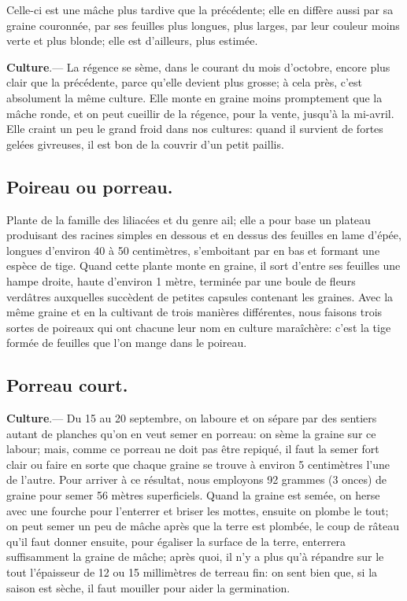 \documentclass[10pt,a4paper]{book}
\begin{document}
Celle-ci est une mâche plus tardive que la précédente; elle en diffère aussi par sa graine couronnée, par ses feuilles plus longues, plus larges, par leur couleur moins verte et plus blonde; elle est d'ailleurs, plus estimée.

\textbf{Culture}.--- La régence se sème, dans le courant du mois d'octobre, encore plus clair que la précédente, parce qu'elle devient plus grosse; à cela près, c'est absolument la même culture. Elle monte en graine moins promptement que la mâche ronde, et on peut cueillir de la régence, pour la vente, jusqu'à la mi-avril. Elle craint un peu le grand froid dans nos cultures: quand il survient de fortes gelées givreuses, il est bon de la couvrir d'un petit paillis.

\subsection{Poireau ou porreau.}

Plante de la famille des liliacées et du genre ail; elle a pour base un plateau produisant des racines simples en dessous et en dessus des feuilles en lame d'épée, longues d'environ 40 à 50 centimètres, s'emboitant par en bas et formant une espèce de tige. Quand cette plante monte en graine, il sort d'entre ses feuilles une hampe droite, haute d'environ 1 mètre, terminée par une boule de fleurs verdâtres auxquelles succèdent de petites capsules contenant les graines. Avec la même graine et en la cultivant de trois manières différentes, nous faisons trois sortes de poireaux qui ont chacune leur nom en culture maraîchère: c'est la tige formée de feuilles que l'on mange dans le poireau.

\subsection{Porreau court.}

\textbf{Culture}.--- Du 15 au 20 septembre, on laboure et on sépare par des sentiers autant de planches qu'on en veut semer en porreau: on sème la graine sur ce labour; mais, comme ce porreau ne doit pas être repiqué, il faut la semer fort clair ou faire en sorte que chaque graine se trouve à environ 5 centimètres l'une de l'autre. Pour arriver à ce résultat, nous employons 92 grammes (3 onces) de graine pour semer 56 mètres superficiels. Quand la graine est semée, on herse avec une fourche pour l'enterrer et briser les mottes, ensuite on plombe le tout; on peut semer un peu de mâche après que la terre est plombée, le coup de râteau qu'il faut donner ensuite, pour égaliser la surface de la terre, enterrera suffisamment la graine de mâche; après quoi, il n'y a plus qu'à répandre sur le tout l'épaisseur de 12 ou 15 millimètres de terreau fin: on sent bien que, si la saison est sèche, il faut mouiller pour aider la germination.
\end{document}
